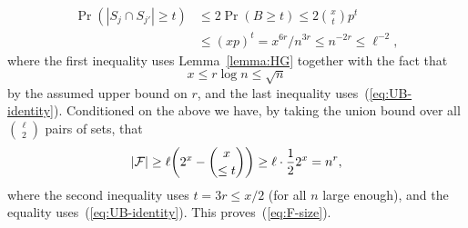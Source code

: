\documentclass[11pt]{article}
\newcommand{\FF}{{\cal F}}
\renewcommand{\a}{\alpha}
\begin{document}
\begin{align*}
\Pr(|S_j \cap S_{j'}| \ge t) &\le 2\Pr(B \ge t) \le 2\binom{x}{t}p^{t} \\
&\le (xp)^{t} = x^{6r}/n^{3r} \le n^{-2r} \le \ell^{-2}, 
\end{align*}
where the first inequality uses Lemma~\ref{lemma:HG} together with the fact that
\begin{equation}\label{eq:UB-x-sqrtn}
x \le r\log n \le \sqrt{n} %
\end{equation}
by the assumed upper bound on $r$, 
and the last inequality uses~(\ref{eq:UB-identity}).
%
Conditioned on the above we have, by taking the union bound over all $\binom{\ell}{2}$ pairs of sets, that
$$|\FF| \ge \ell \bigg(2^x-\binom{x}{\le t}\bigg) \ge \ell \cdot \frac12 2^x = n^r ,$$
where the second inequality uses $t = 3r \le x/2$ (for all $n$ large enough), and the equality uses~(\ref{eq:UB-identity}). This proves~(\ref{eq:F-size}).


\end{document}
